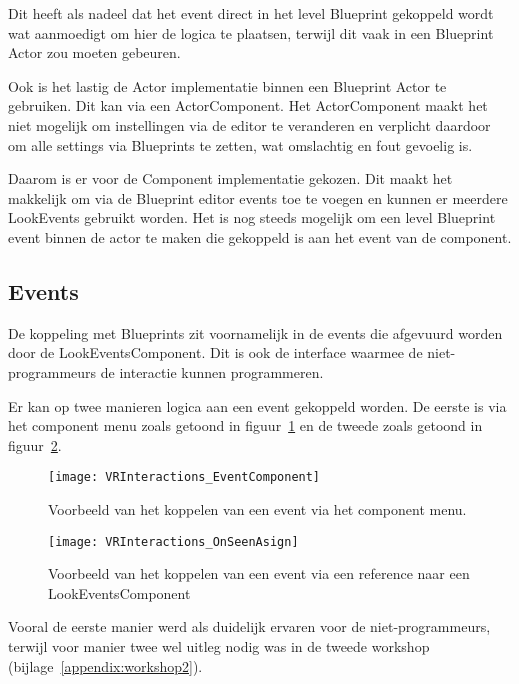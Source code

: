 Dit heeft als nadeel dat het event direct in het level Blueprint gekoppeld wordt wat aanmoedigt om hier de logica te plaatsen, terwijl dit vaak in een Blueprint Actor zou moeten gebeuren.

Ook is het lastig de Actor implementatie binnen een Blueprint Actor te gebruiken. Dit kan via een ActorComponent. Het ActorComponent maakt het niet mogelijk om instellingen via de editor te veranderen en verplicht daardoor om alle settings via Blueprints te zetten, wat omslachtig en fout gevoelig is.

Daarom is er voor de Component implementatie gekozen. Dit maakt het makkelijk om via de Blueprint editor events toe te voegen en kunnen er meerdere LookEvents gebruikt worden. Het is nog steeds mogelijk om een level Blueprint event binnen de actor te maken die gekoppeld is aan het event van de component.

\subsection{Events}
De koppeling met Blueprints zit voornamelijk in de events die afgevuurd worden door de LookEventsComponent. Dit is ook de interface waarmee de niet-programmeurs de interactie kunnen programmeren.

Er kan op twee manieren logica aan een event gekoppeld worden. De eerste is via het component menu zoals getoond in figuur~\ref{fig:ComponentMenuEvent} en de tweede zoals getoond in figuur~\ref{fig:ComponentReferenceAsign}.

\begin{figure}[H]
  \centering
    \texttt{[image: VRInteractions\_EventComponent]}
    \caption{Voorbeeld van het koppelen van een event via het component menu.}
    \label{fig:ComponentMenuEvent}
\end{figure}

\begin{figure}[H]
  \centering
    \texttt{[image: VRInteractions\_OnSeenAsign]}
    \caption{Voorbeeld van het koppelen van een event via een reference naar een LookEventsComponent}
    \label{fig:ComponentReferenceAsign}
\end{figure}

Vooral de eerste manier werd als duidelijk ervaren voor de niet-programmeurs, terwijl voor manier twee wel uitleg nodig was in de tweede workshop (bijlage~\ref{appendix:workshop2}).

